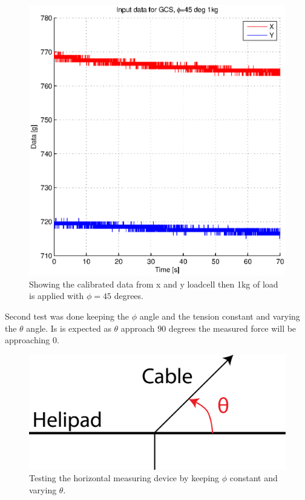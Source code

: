 \begin{figure}[H]
\centering
\includegraphics[scale=1]{graphics/gcs_test/phi45deg1kgdata.eps}
\caption{Showing the calibrated data from x and y loadcell then 1kg of load is applied with $\phi=45$ degrees.}
\label{fig:phi45deg1kgdata}
\end{figure}



\noindent
Second test was done keeping the $\phi$ angle and the tension constant and varying the $\theta$ angle. Is is expected as $\theta$ approach $90$ degrees the measured force will be approaching $0$. 
\begin{figure}[H]
\centering
\includegraphics[scale=0.75]{graphics/loadcell_test2.png}
\caption{Testing the horizontal measuring device by keeping $\phi$ constant and varying $\theta$.}
\label{fig:loadcell_test2}
\end{figure}

